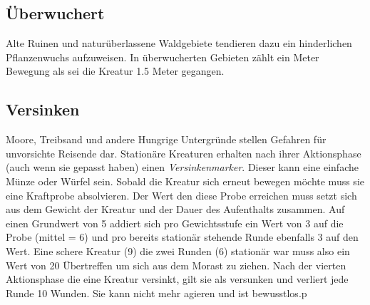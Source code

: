\subsection*{Überwuchert} \label{gb:überwuchert}
Alte Ruinen und naturüberlassene Waldgebiete tendieren dazu ein hinderlichen Pflanzenwuchs aufzuweisen. In überwucherten Gebieten zählt ein Meter Bewegung als sei die Kreatur 1.5 Meter gegangen.

\subsection*{Versinken} \label{gb:versinken}
Moore, Treibsand und andere Hungrige Untergründe stellen Gefahren für unvorsichte Reisende dar. Stationäre Kreaturen erhalten nach ihrer Aktionsphase (auch wenn sie gepasst haben) einen \textit{Versinkenmarker}. Dieser kann eine einfache Münze oder Würfel sein. Sobald die Kreatur sich erneut bewegen möchte muss sie eine Kraftprobe absolvieren. Der Wert den diese Probe erreichen muss setzt sich aus dem Gewicht der Kreatur und der Dauer des Aufenthalts zusammen. Auf einen Grundwert von 5 addiert sich pro Gewichtsstufe ein Wert von 3 auf die Probe (mittel = 6) und pro bereits stationär stehende Runde ebenfalls 3 auf den Wert. Eine schere Kreatur (9) die zwei Runden (6) stationär war muss also ein Wert von 20 Übertreffen um sich aus dem Morast zu ziehen. Nach der vierten Aktionsphase die eine Kreatur versinkt, gilt sie als versunken und verliert jede Runde 10 Wunden. Sie kann nicht mehr agieren und ist bewusstlos.p